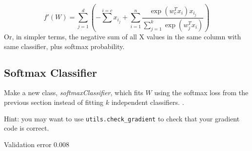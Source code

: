 \documentclass{article}
\begin{document}
\[ f'(W) = \sum_{j=1}^d(-\sum^{i=c} x_i_j + \sum_{i=1}^n \frac{\exp(w_c^Tx_i)x_i_j}{\sum_{j=1}^k \exp(w_j^Tx_i)}) \]
Or, in simpler terms, the negative sum of all X values in the same column with same classifier, plus softmax probability.

\subsection{Softmax Classifier}

Make a new class, \emph{softmaxClassifier}, which fits $W$ using the softmax loss from the previous section  instead of fitting $k$ independent classifiers. .

Hint: you may want to use \verb|utils.check_gradient| to check that your gradient code is correct.

Validation error 0.008
\end{document}
